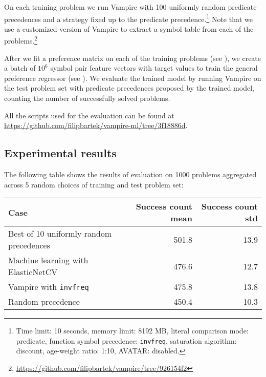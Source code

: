 On each training problem we run %
Vampire with 100 uniformly random predicate precedences
and a strategy fixed up to the predicate precedence.\footnote{Time limit: 10 seconds, memory limit: 8192 MB, literal comparison mode: predicate, function symbol precedence: \texttt{invfreq}, saturation algorithm: discount, age-weight ratio: 1:10, AVATAR: disabled.}
Note that we use a customized version of Vampire to extract a symbol table from each of the problems.\footnote{\url{https://github.com/filipbartek/vampire/tree/926154f2}}

After we fit a preference matrix on each of the training problems (see ),
we create a batch of \(10^6\) symbol pair feature vectors with target values
to train the general preference regressor (see ).
We evaluate the trained model by running Vampire on the test problem set with predicate precedences
proposed by the trained model,
counting the number of successfully solved problems.

All the scripts used for the evaluation can be found at
\url{https://github.com/filipbartek/vampire-ml/tree/3f18886d}.

\subsection{Experimental results}

The following table shows the results of evaluation on 1000 problems aggregated
across 5 random choices of training and test problem set:

\begin{tabular}{lrr}
	Case & Success count mean & Success count std \\
	\hline
	Best of 10 uniformly random precedences & 501.8 & 13.9 \\
	Machine learning with ElasticNetCV & 476.6 & 12.7 \\
	Vampire with \texttt{invfreq} & 475.8 & 13.8 \\
	Random precedence & 450.4 & 10.3 \\
\end{tabular}

